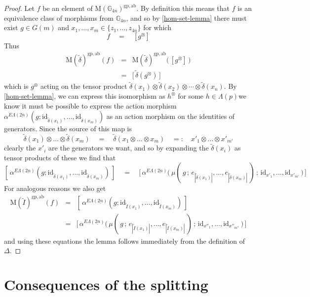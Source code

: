 \documentclass{amsbook} %
\newcommand{\id}{\textrm{id}}
\newcommand{\ELnn}{E\Lambda(\underline{2n})}
\numberwithin{section}{chapter}
\begin{document}
\begin{proof}  
Let $f$ be an element of $\mathrm{M}(\mathbb{G}_{4n})^{\mathrm{gp, ab}}$. By definition this means that $f$ is an equivalence class of morphisms from $\mathbb{G}_{4n}$, and so by \cref{hom-set-lemma} there must exist $g \in G(m)$ and $x_1, \ldots, x_m \in \{ z_1, \ldots, z_{4n} \}$ for which
\[ f \quad = \quad [g^{\otimes} ] \]
Thus
\[ \begin{array}{rll}
			\mathrm{M}(\tilde{\delta})^{\mathrm{gp, ab}}(f) & = & \mathrm{M}(\tilde{\delta})^{\mathrm{gp, ab}} \big( \, [ g^{\otimes} ] \, \big) \\
			& = & \big[ \, \tilde{\delta}(g^{\otimes}) \, \big]  
		\end{array}
\]
which is $g^{\otimes}$ acting on the tensor product $\tilde{\delta}(x_1) \otimes \tilde{\delta}(x_2) \otimes \cdots \otimes \tilde{\delta}(x_n)$.
By \cref{hom-set-lemma}, we can express this isomorphism as $h^{\otimes}$ for some $h \in \Lambda(p)$we know it must be possible to express the action morphism $\alpha^{\ELnn}(g; \id_{\tilde{\delta}(x_1)}, \ldots, \id_{\tilde{\delta}(x_m)})$ as an action morphism on the identities of generators. Since the source of this map is
\[ \tilde{\delta}(x_1) \otimes \ldots \otimes \tilde{\delta}(x_m) \quad = \quad \tilde{\delta}(x_1 \otimes \ldots \otimes x_m) \quad =: \quad x'_1 \otimes \ldots \otimes x'_{m'}  \]
clearly the $x'_i$ are the generators we want, and so by expanding the $\tilde{\delta}(x_i)$ as tensor products of these we find that
\[ [ \, \alpha^{\ELnn}(g; \id_{\tilde{\delta}(x_1)}, \ldots, \id_{\tilde{\delta}(x_m)})  \, ] \quad = \quad \big[ \, \alpha^{\ELnn}\big( \, \mu( \, g \, ; \, e_{|\tilde{\delta}(x_1)|}, \ldots, e_{|\tilde{\delta}(x_m)|} \, ) \, ; \, \id_{x'_1}, \ldots, \id_{x'_{m'}} \, \big) \, \big] \]
For analogous reasons we also get
\[ \begin{array}{rll}
			\mathrm{M}(\tilde{I})^{\mathrm{gp, ab}}(f) & = & [ \, \alpha^{\ELnn}(g; \id_{\tilde{I}(x_1)}, \ldots, \id_{\tilde{I}(x_m)}) \, ]  \\
			& = &  \big[ \, \alpha^{\ELnn}\big( \, \mu( \, g \, ; \, e_{|\tilde{I}(x_1)|}, \ldots, e_{|\tilde{I}(x_m)|} \, ) \, ; \, \id_{x''_1}, \ldots,  \id_{x''_{m''}} \, \big) \, \big]
		\end{array}
\]
and using these equations the lemma follows immediately from the definition of $\Delta$.
\end{proof}




\section{Consequences of the splitting}\label{conseq_spl}
\end{document}
